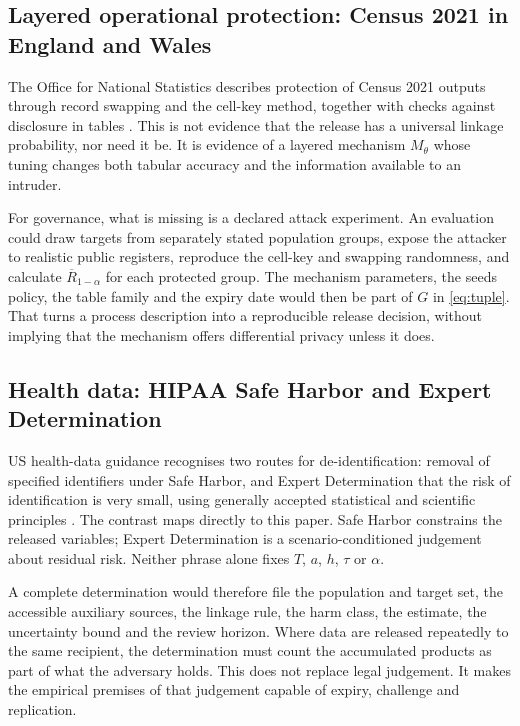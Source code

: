 \documentclass[11pt,a4paper]{article}
\theoremstyle{plain}
\theoremstyle{definition}
\begin{document}
\subsection{Layered operational protection: Census 2021 in England and Wales}

The Office for National Statistics describes protection of Census 2021 outputs
through record swapping and the cell-key method, together with checks against
disclosure in tables \citep{ons2022}. This is not evidence that the release has a
universal linkage probability, nor need it be. It is evidence of a layered
mechanism $M_\theta$ whose tuning changes both tabular accuracy and the
information available to an intruder.

For governance, what is missing is a declared attack experiment. An evaluation
could draw targets from separately stated population groups, expose the attacker
to realistic public registers, reproduce the cell-key and swapping randomness,
and calculate $\overline{R}_{1-\alpha}$ for each protected group. The mechanism
parameters, the seeds policy, the table family and the expiry date would then be
part of $G$ in \eqref{eq:tuple}. That turns a process description into a
reproducible release decision, without implying that the mechanism offers
differential privacy unless it does.

\subsection{Health data: HIPAA Safe Harbor and Expert Determination}

US health-data guidance recognises two routes for de-identification: removal of
specified identifiers under Safe Harbor, and Expert Determination that the risk
of identification is very small, using generally accepted statistical and
scientific principles \citep{hhs2012}. The contrast maps directly to this paper.
Safe Harbor constrains the released variables; Expert Determination is a
scenario-conditioned judgement about residual risk. Neither phrase alone fixes
$T$, $a$, $h$, $\tau$ or $\alpha$.

A complete determination would therefore file the population and target set, the
accessible auxiliary sources, the linkage rule, the harm class, the estimate, the
uncertainty bound and the review horizon. Where data are released repeatedly to
the same recipient, the determination must count the accumulated products as part
of what the adversary holds. This does not replace legal judgement. It makes the
empirical premises of that judgement capable of expiry, challenge and
replication.
\end{document}
